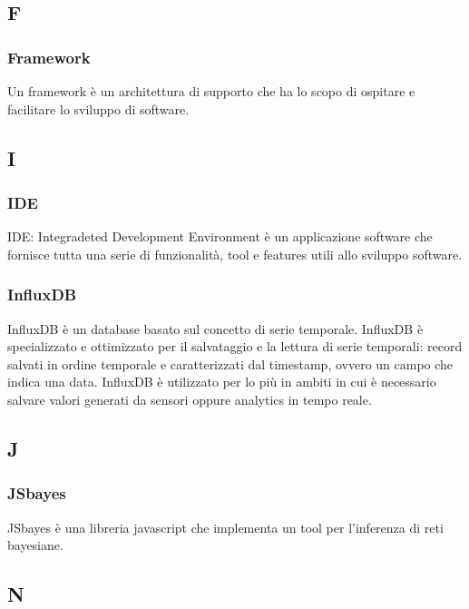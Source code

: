 \subsection*{F}

	\subsubsection*{Framework} 
	\label{sec:ide}
Un framework è un architettura di supporto che ha lo scopo di ospitare e facilitare lo sviluppo di software.


\subsection*{I}

	\subsubsection*{IDE} 
	\label{sec:ide}
IDE: Integradeted Development Environment è un applicazione software che fornisce tutta una serie di funzionalità, tool e features utili allo sviluppo software.

	\subsubsection*{InfluxDB} 
	\label{sec:influxdb}
InfluxDB è un database basato sul concetto di serie temporale. InfluxDB è specializzato e ottimizzato per il salvataggio e la lettura di serie temporali: record salvati in ordine temporale e caratterizzati dal timestamp, ovvero un campo che indica una data. InfluxDB è utilizzato per lo più in ambiti in cui è necessario salvare valori generati da sensori oppure analytics in tempo reale.
	
\subsection*{J}

	\subsubsection*{JSbayes} 
	\label{sec:influxdb}
JSbayes è una libreria javascript che implementa un tool per l'inferenza di reti bayesiane. 


\subsection*{N}

